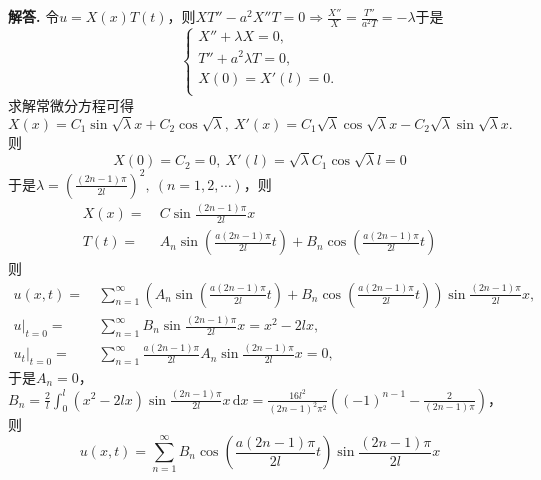 \documentclass[12pt, a4paper, oneside]{ctexart}
\newenvironment{solution}{\par\noindent\textbf{解答. }}{\smallskip\par}
\def\d{\mathrm{d}}          %
\begin{document}
\begin{solution}
    令$u = X(x)T(t)$，则$XT''-a^2X''T = 0\Rightarrow \frac{X''}{X} = \frac{T''}{a^2T}=-\lambda$于是
    \begin{equation*}
        \begin{cases}
            X''+\lambda X = 0,\\
            T''+a^2\lambda T = 0,\\
            X(0) = X'(l) = 0.\\
        \end{cases}
    \end{equation*}
    求解常微分方程可得
    \begin{equation*}
        X(x) = C_1\sin\sqrt{\lambda}x+C_2\cos\sqrt{\lambda},\ X'(x) = C_1\sqrt{\lambda}\cos\sqrt{\lambda}x-C_2\sqrt{\lambda}\sin\sqrt{\lambda}x.
    \end{equation*}
    则
    \begin{equation*}
        X(0) = C_2 = 0,\ X'(l) = \sqrt{\lambda}C_1\cos\sqrt{\lambda}l = 0
    \end{equation*}
    于是$\lambda = \left(\frac{(2n-1)\pi}{2l}\right)^2,\ (n=1,2,\cdots)$，则
    \begin{align*}
        X(x) =&\ C\sin\frac{(2n-1)\pi}{2l}x\\
        T(t) =&\ A_n\sin\left(\frac{a(2n-1)\pi}{2l}t\right)+B_n\cos\left(\frac{a(2n-1)\pi}{2l}t\right)
    \end{align*}
    则
    \begin{align*}
        u(x,t) =&\ \sum_{n=1}^\infty(A_n\sin\left(\frac{a(2n-1)\pi}{2l}t\right)+B_n\cos\left(\frac{a(2n-1)\pi}{2l}t\right))\sin\frac{(2n-1)\pi}{2l}x,\\
        u|_{t=0}=&\ \sum_{n=1}^\infty B_n\sin\frac{(2n-1)\pi}{2l}x = x^2-2lx,\\
        u_t|_{t=0}=&\ \sum_{n=1}^\infty \frac{a(2n-1)\pi}{2l}A_n\sin\frac{(2n-1)\pi}{2l}x = 0,
    \end{align*}
    于是$A_n = 0$，$B_n = \frac{2}{l}\int_0^l(x^2-2lx)\sin\frac{(2n-1)\pi}{2l}x\,\d x = \frac{16l^2}{(2n-1)^2\pi^2}\left((-1)^{n-1}-\frac{2}{(2n-1)\pi}\right)$，则
    \begin{equation*}
        u(x,t) = \sum_{n=1}^\infty B_n\cos\left(\frac{a(2n-1)\pi}{2l}t\right)\sin\frac{(2n-1)\pi}{2l}x
    \end{equation*}
\end{solution}
\end{document}
